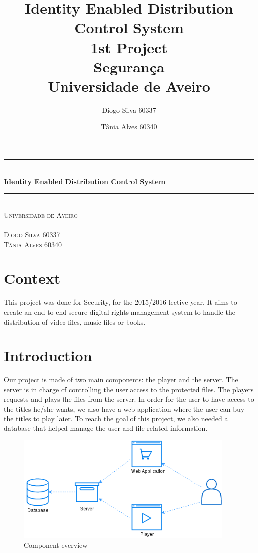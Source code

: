 \documentclass[11pt,a4paper]{report}
\title{\textbf{Identity Enabled Distribution Control System} \\1st Project\\ Segurança\\Universidade de Aveiro}
\author{Diogo Silva 60337 \and Tânia Alves 60340 }
\newcommand{\HRule}{\rule{\linewidth}{0.5mm}}
\begin{document}
\begin{titlepage}
\begin{center}
\HRule \\[0.4cm]
{ \huge \bfseries Identity Enabled Distribution Control System \\[0.4cm] }
\HRule \\[1.5cm]
\textsc{\LARGE Universidade de Aveiro}\\[1.5cm]
\textsc{}\\[1.5cm]
\textsc{Diogo Silva 60337 \\Tânia Alves 60340 }
\end{center}
\end{titlepage}
\maketitle
\tableofcontents

\chapter*{Context}
This project was done for Security, for the 2015/2016 lective year.
It aims to create an end to end secure digital rights management system to handle the distribution of video files, music files or books.

\chapter*{Introduction}

Our project is made of two main components: the player and the server.
The server is in charge of controlling the user access to the protected files. 
The players requests and plays the files from the server.
In order for the user to have access to the titles he/she wants, we also have a web application where the user can buy the titles to play later.
To reach the goal of this project, we also needed a database that helped manage the user and file related information.

\begin{figure}[H]
\centerline{\includegraphics[width=300pt]{images/overview.png}}
\caption{Component overview}
\label{schema}
\end{figure}
\end{document}
